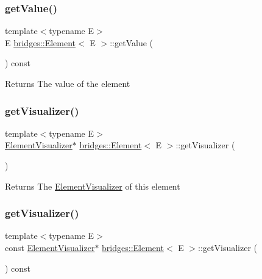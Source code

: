 \subsubsection{\texorpdfstring{get\+Value()}{getValue()}}
{\footnotesize\ttfamily template$<$typename E$>$ \\
E \mbox{\hyperlink{classbridges_1_1_element}{bridges\+::\+Element}}$<$ E $>$\+::get\+Value (\begin{DoxyParamCaption}{ }\end{DoxyParamCaption}) const\hspace{0.3cm}{\ttfamily [inline]}}

\begin{DoxyReturn}{Returns}
The value of the element 
\end{DoxyReturn}
\mbox{\label{classbridges_1_1_element_a358f350ae6e33d55c4ac9f9213d0c5bc}} 
\subsubsection{\texorpdfstring{get\+Visualizer()}{getVisualizer()}\hspace{0.1cm}{\footnotesize\ttfamily [1/2]}}
{\footnotesize\ttfamily template$<$typename E$>$ \\
\mbox{\hyperlink{classbridges_1_1_element_visualizer}{Element\+Visualizer}}$\ast$ \mbox{\hyperlink{classbridges_1_1_element}{bridges\+::\+Element}}$<$ E $>$\+::get\+Visualizer (\begin{DoxyParamCaption}{ }\end{DoxyParamCaption})\hspace{0.3cm}{\ttfamily [inline]}}

\begin{DoxyReturn}{Returns}
The \mbox{\hyperlink{classbridges_1_1_element_visualizer}{Element\+Visualizer}} of this element 
\end{DoxyReturn}
\mbox{\label{classbridges_1_1_element_a27d023054130e17234ace34ba35e766e}} 
\subsubsection{\texorpdfstring{get\+Visualizer()}{getVisualizer()}\hspace{0.1cm}{\footnotesize\ttfamily [2/2]}}
{\footnotesize\ttfamily template$<$typename E$>$ \\
const \mbox{\hyperlink{classbridges_1_1_element_visualizer}{Element\+Visualizer}}$\ast$ \mbox{\hyperlink{classbridges_1_1_element}{bridges\+::\+Element}}$<$ E $>$\+::get\+Visualizer (\begin{DoxyParamCaption}{ }\end{DoxyParamCaption}) const\hspace{0.3cm}{\ttfamily [inline]}}

